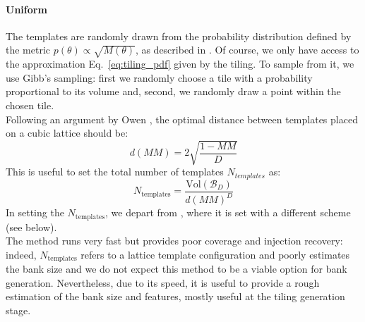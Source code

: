\documentclass[twocolumn,showpacs,preprintnumbers,nofootinbib,prd,
superscriptaddress,10pt]{revtex4-2}
\begin{document}
\paragraph{Uniform}\label{par:uniform}
The templates are randomly drawn from the probability distribution defined by the metric $p(\theta) \propto \sqrt{M(\theta)}$, as described in \cite{Messenger:2008ta}.
Of course, we only have access to the approximation Eq.~\eqref{eq:tiling_pdf} given by the tiling. To sample from it, we use Gibb's sampling: first we randomly choose a tile with a probability proportional to its volume and, second, we randomly draw a point within the chosen tile.
\\
Following an argument by Owen \cite{owen_metric}, the optimal distance between templates placed on a cubic lattice should be:
\begin{equation}
	d(MM) = 2 \sqrt{\frac{1-MM}{D}}
\end{equation}
This is useful to set the total number of templates $N_{templates}$ as:
\begin{equation} \label{eq:N_templates}
	N_{\text{templates}} = \frac{\text{Vol}(\mathcal{B}_D)}{d(MM)^D}
\end{equation}
In setting the $N_{\text{templates}}$, we depart from \cite{Messenger:2008ta}, where it is set with a different scheme (see below).
\\
The method runs very fast but provides poor coverage and injection recovery: indeed, $N_{\text{templates}}$ refers to a lattice template configuration and poorly estimates the bank size and we do not expect this method to be a viable option for bank generation.
Nevertheless, due to its speed, it is useful to provide a rough estimation of the bank size and features, mostly useful at the tiling generation stage.
\end{document}
